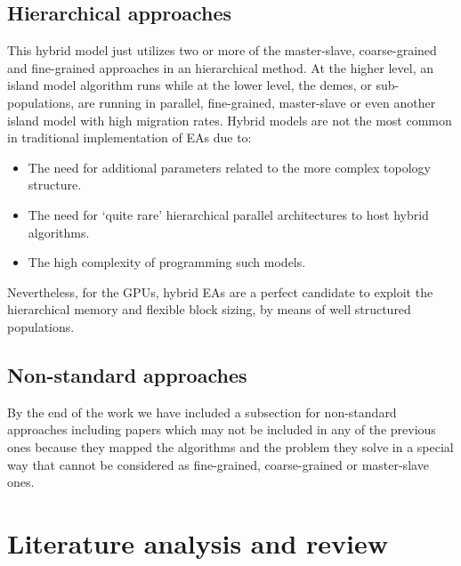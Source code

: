 \documentclass{article}
\begin{document}
\subsection{Hierarchical approaches}
\label{subsec:hierarchicalapproaches}

This hybrid model just utilizes two or more of the master-slave, coarse-grained and fine-grained approaches in an hierarchical method. At the higher level, an island model algorithm runs while at the lower level, the demes, or sub-populations, are running in parallel, fine-grained, master-slave or even another island model with high migration rates. Hybrid models are not the most common in traditional implementation of EAs due to:
\begin{itemize}
 \item The need for additional parameters related to the more complex topology structure.
 \item The need for `quite rare' hierarchical parallel architectures to host hybrid algorithms.
\item The high complexity of programming such models.
\end{itemize}

Nevertheless, for the GPUs, hybrid EAs are a perfect candidate to exploit the hierarchical memory and flexible block sizing, by means of well structured populations.


\subsection{Non-standard approaches}
\label{subsec:nonstandardapproaches}

By the end of the work we have included a subsection for non-standard
approaches \cite{DBLP:conf/gecco/PospichalMOSJ11} including papers
which may not be included in any of the previous ones because they
mapped the algorithms and the problem they solve in a special way that
cannot be considered as fine-grained, coarse-grained or master-slave
ones.



\section{Literature analysis and review}
\label{sec:survey}
\end{document}
